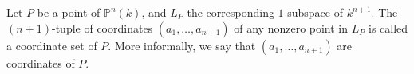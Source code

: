 Let $P$ be a point of $\mathbb{P}^n(k)$, and $L_P$ the corresponding $1$-subspace of $k^{n+1}$. The $(n+1)$-tuple of coordinates $(a_1, \ldots, a_{n+1})$ of any nonzero point in $L_P$ is called a coordinate set of $P$. More informally, we say that $(a_1, \ldots, a_{n+1})$ are coordinates of $P$.
